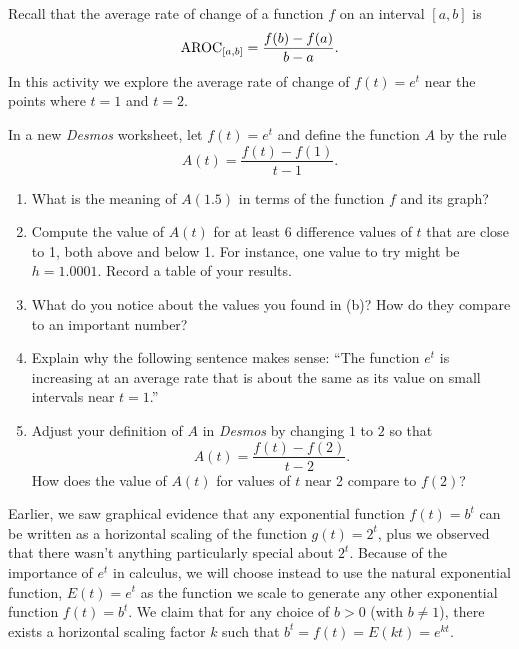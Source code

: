 \documentclass[nooutcomes]{ximera}
\begin{document}
\begin{exploration}
Recall that the average rate of change of a function $f$ on an interval $[a,b]$ is%
\begin{equation*}
\mathrm{AROC}_{[a,b]} = \frac{f(b)-f(a)}{b-a}\text{.}
\end{equation*}
In this activity we explore the average rate of change of $f(t) = e^t$ near the points where $t = 1$ and $t = 2$.%
\par
\hypertarget{p-1392}{}%
In a new \emph{Desmos} worksheet, let $f(t) = e^t$ and define the function $A$ by the rule%
\begin{equation*}
A(t) = \frac{f(t)-f(1)}{t-1}\text{.}
\end{equation*}
\begin{enumerate}[label=\alph*.]
\item What is the meaning of $A(1.5)$ in terms of the function $f$ and its graph?%
\item Compute the value of $A(t)$ for at least $6$ difference values of $t$ that are close to 1, both above and below 1.  For instance, one value to try might be $h = 1.0001$.  Record a table of your results.%
\item\hypertarget{li-634}{}\hypertarget{p-1396}{}%
What do you notice about the values you found in (b)?  How do they compare to an important number?%
\item\hypertarget{li-635}{}\hypertarget{p-1397}{}%
Explain why the following sentence makes sense: ``The function $e^t$ is increasing at an average rate that is about the same as its value on small intervals near $t = 1$.''%
\item\hypertarget{li-636}{}\hypertarget{p-1398}{}%
Adjust your definition of $A$ in \emph{Desmos} by changing $1$ to $2$ so that%
\begin{equation*}
A(t) = \frac{f(t)-f(2)}{t-2}\text{.}
\end{equation*}
How does the value of $A(t)$ for values of $t$ near 2 compare to $f(2)$?%
\end{enumerate}

\end{exploration}



Earlier, we saw graphical evidence that any exponential function $f(t) = b^t$ can be written as a horizontal scaling of the function $g(t) = 2^t$, plus we observed that there wasn't anything particularly special about $2^t$.    Because of the importance of $e^t$ in calculus, we will choose instead to use the natural exponential function, 	$E(t) = e^t$ as the function we scale to generate any other exponential function $f(t) = b^t$.  We claim that for any choice of $b > 0$ (with $b \ne 1$), there exists a horizontal scaling factor $k$ such that $b^t = f(t) = E(kt) = e^{kt}$.
\end{document}
